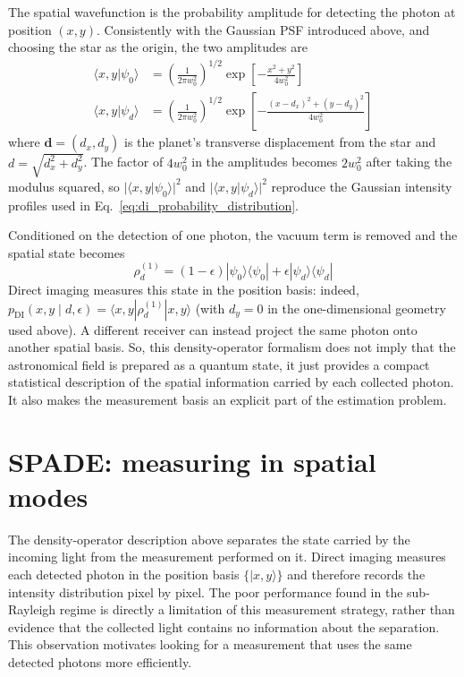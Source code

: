 The spatial wavefunction is the probability amplitude for detecting the photon at position $(x,y)$.  Consistently with the Gaussian PSF introduced above, and choosing the star as the origin, the two amplitudes are
\begin{align}
    \langle x,y|\psi_0\rangle
     & =\left(\frac{1}{2\pi w_0^2}\right)^{1/2}
    \exp\!\left[-\frac{x^2+y^2}{4w_0^2}\right]
    \label{eq:star_wavefunction}                \\
    \langle x,y|\psi_d\rangle
     & =\left(\frac{1}{2\pi w_0^2}\right)^{1/2}
    \exp\!\left[-\frac{(x-d_x)^2+(y-d_y)^2}{4w_0^2}\right]
    \label{eq:planet_wavefunction}
\end{align}
where $\boldsymbol d=(d_x,d_y)$ is the planet's transverse displacement from the star and $d=\sqrt{d_x^2+d_y^2}$.  The factor of $4w_0^2$ in the amplitudes becomes $2w_0^2$ after taking the modulus squared, so $|\langle x,y|\psi_0\rangle|^2$ and $|\langle x,y|\psi_d\rangle|^2$ reproduce the Gaussian intensity profiles used in Eq.~\eqref{eq:di_probability_distribution}.

Conditioned on the detection of one photon, the vacuum term is removed and the spatial state becomes
\begin{equation}
    \rho_d^{(1)}=(1-\epsilon)|\psi_0\rangle\langle\psi_0|
    +\epsilon|\psi_d\rangle\langle\psi_d|
    \label{eq:conditional_one_photon_state}
\end{equation}
Direct imaging measures this state in the position basis: indeed,
$p_{\mathrm{DI}}(x,y\mid d,\epsilon)=\langle x,y|\rho_d^{(1)}|x,y\rangle$ (with $d_y=0$ in the one-dimensional geometry used above).  A different receiver can instead project the same photon onto another spatial basis.
So, this density-operator formalism does not imply that the astronomical field is prepared as a quantum state, it just provides a compact statistical description of the spatial information carried by each collected photon. It also makes the measurement basis an explicit part of the estimation problem.

\section{SPADE: measuring in spatial modes}

The density-operator description above separates the state carried by the incoming light from the measurement performed on it. Direct imaging measures each detected photon in the position basis $\{|x,y\rangle\}$ and therefore records the intensity distribution pixel by pixel. The poor performance found in the sub-Rayleigh regime is directly a limitation of this measurement strategy, rather than evidence that the collected light contains no information about the separation. This observation motivates looking for a measurement that uses the same detected photons more efficiently.

